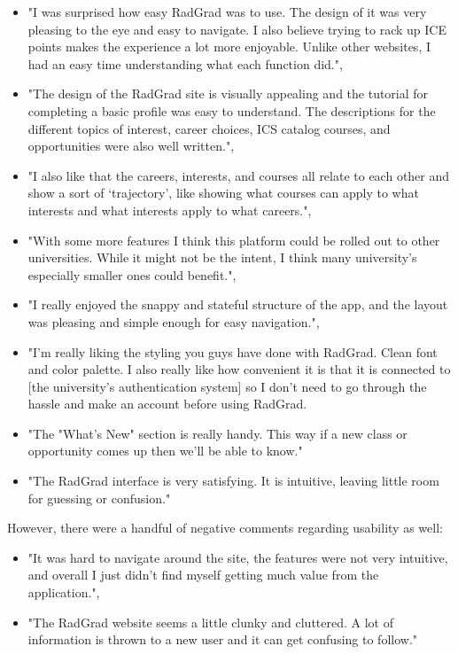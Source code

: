 \documentclass[acmsmall]{acmart}
\begin{document}
\begin{itemize}[leftmargin=*]
\item "I was surprised how easy RadGrad was to use. The design of it was very pleasing to the eye and easy to navigate. I also believe trying to rack up ICE points makes the experience a lot more enjoyable. Unlike other websites, I had an easy time understanding what each function did.",
\item "The design of the RadGrad site is visually appealing and the tutorial for completing a basic profile was easy to understand. The descriptions for the different topics of interest, career choices, ICS catalog courses, and opportunities were also well written.",
\item "I also like that the careers, interests, and courses all relate to each other and show a sort of ‘trajectory’, like showing what courses can apply to what interests and what interests apply to what careers.",
\item "With some more features I think this platform could be rolled out to other universities. While it might not be the intent, I think many university’s especially smaller ones could benefit.",
\item "I really enjoyed the snappy and stateful structure of the app, and the layout was pleasing and simple enough for easy navigation.",
\item "I'm really liking the styling you guys have done with RadGrad. Clean font and color palette. I also really like how convenient it is that it is connected to [the university's authentication system] so I don't need to go through the hassle and make an account before using RadGrad.
\item "The "What's New" section is really handy. This way if a new class or opportunity comes up then we'll be able to know."
\item "The RadGrad interface is very satisfying. It is intuitive, leaving little room for guessing or confusion."
\end{itemize}

However, there were a handful of negative comments regarding usability as well:
\begin{itemize}[leftmargin=*]
\item "It was hard to navigate around the site, the features were not very intuitive, and overall I just didn’t find myself getting much value from the application.",
\item "The RadGrad website seems a little clunky and cluttered. A lot of information is thrown to a new user and it can get confusing to follow."
\end{itemize}
\end{document}
